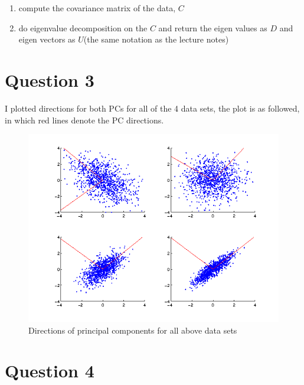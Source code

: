 \documentclass[paper=a4, fontsize=11pt]{scrartcl} %
\numberwithin{equation}{section} %
\numberwithin{figure}{section} %
\numberwithin{table}{section} %
\begin{document}
\begin {enumerate}
\item compute the covariance matrix of the data, $C$
\item do eigenvalue decomposition on the $C$ and return the eigen values as $D$ and eigen vectors as $U$(the same notation as the lecture notes)
\end {enumerate}

  

\section {Question 3}

I plotted  directions for both PCs for all of the 4 data sets, the plot is as followed, in which red lines denote the PC directions.

\begin{figure}[H]
  \centering
  \includegraphics[scale=.7]{eigen_vectors}
  \caption{Directions of principal components for all above data sets}
\end{figure}



\section {Question 4}
\end{document}
